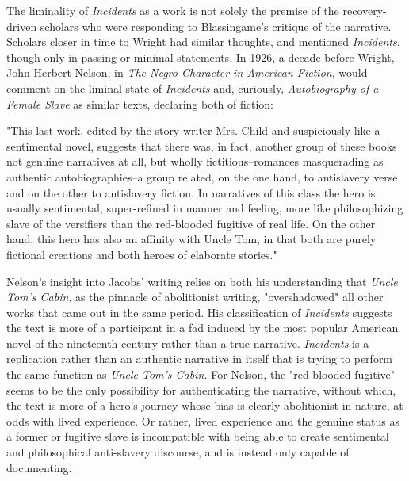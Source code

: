 The liminality of \textit{Incidents} as a work is not solely the premise of the recovery-driven scholars who were responding to Blassingame's critique of the narrative. Scholars closer in time to Wright had similar thoughts, and mentioned \textit{Incidents}, though only in passing or minimal statements. In 1926, a decade before Wright, John Herbert Nelson, in \textit{The Negro Character in American Fiction}, would comment on the liminal state of \textit{Incidents} and, curiously, \textit{Autobiography of a Female Slave} as similar texts, declaring both of fiction:
\begin{displayquote}
"This last work, edited by the story-writer Mrs. Child and suspiciously like a sentimental novel, suggests that there was, in fact, another group of these books not genuine narratives at all, but wholly fictitious--romances masquerading as authentic autobiographies--a group related, on the one hand, to antislavery verse and on the other to antislavery fiction. In narratives of this class the hero is usually sentimental, super-refined in manner and feeling, more like philosophizing slave of the versifiers than the red-blooded fugitive of real life. On the other hand, this hero has also an affinity with Uncle Tom, in that both are purely fictional creations and both heroes of elaborate stories."\autocite[66]{nelson_negro_1926}
\end{displayquote}
Nelson's insight into Jacobs' writing relies on both his understanding that \textit{Uncle Tom's Cabin}, as the pinnacle of abolitionist writing, "overshadowed" all other works that came out in the same period.\autocite[67]{nelson_negro_1926} His classification of \textit{Incidents} suggests the text is more of a participant in a fad induced by the most popular American novel of the nineteenth-century rather than a true narrative. \textit{Incidents} is a replication rather than an authentic narrative in itself that is trying to perform the same function as \textit{Uncle Tom's Cabin.} For Nelson, the "red-blooded fugitive" seems to be the only possibility for authenticating the narrative, without which, the text is more of a hero's journey whose bias is clearly abolitionist in nature, at odds with lived experience. Or rather, lived experience and the genuine status as a former or fugitive slave is incompatible with being able to create sentimental and philosophical anti-slavery discourse, and is instead only capable of documenting. 

